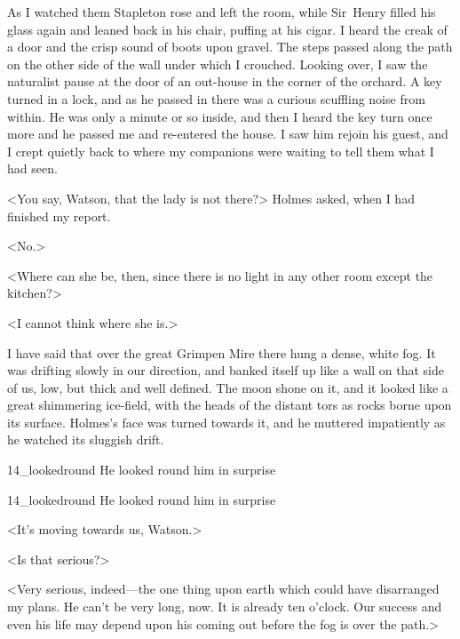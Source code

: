 As I watched them Stapleton rose and left the room, while Sir~Henry filled his glass again and leaned back in his chair, puffing at his cigar. I heard the creak of a door and the crisp sound of boots upon gravel. The steps passed along the path on the other side of the wall under which I crouched. Looking over, I saw the naturalist pause at the door of an out-house in the corner of the orchard. A key turned in a lock, and as he passed in there was a curious scuffling noise from within. He was only a minute or so inside, and then I heard the key turn once more and he passed me and re-entered the house. I saw him rejoin his guest, and I crept quietly back to where my companions were waiting to tell them what I had seen.

<You say, Watson, that the lady is not there?> Holmes asked, when I had finished my report.

<No.>

<Where can she be, then, since there is no light in any other room except the kitchen?>

<I cannot think where she is.>

I have said that over the great Grimpen Mire there hung a dense, white fog. It was drifting slowly in our direction, and banked itself up like a wall on that side of us, low, but thick and well defined. The moon shone on it, and it looked like a great shimmering ice-field, with the heads of the distant tors as rocks borne upon its surface. Holmes's face was turned towards it, and he muttered impatiently as he watched its sluggish drift.


\begin{letter}
	\begin{bwbigpic}
			[1.0]  
		{14_lookedround}
		{He looked round him in surprise}
	\end{bwbigpic}
\end{letter}
\begin{a4}
	\begin{bwbigpic}
		[1.0] 
		{14_lookedround}
		{He looked round him in surprise}
	\end{bwbigpic}
\end{a4}

<It's moving towards us, Watson.>

<Is that serious?>

<Very serious, indeed—the one thing upon earth which could have disarranged my plans. He can't be very long, now. It is already ten o'clock. Our success and even his life may depend upon his coming out before the fog is over the path.>

